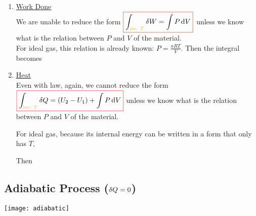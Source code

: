 \documentclass[class=article, crop=false, 12pt]{standalone}
\begin{document}
\begin{enumerate}
    \item \ul{Work Done}\\
    We are unable to reduce the form $\cbox[red]{\displaystyle \int_\yellow{\text{iso. }T}\var{W} = \int P\dd{V}}$ 
    unless we know what is the relation between $P$ and $V$ of the material.\\

    For ideal gas, this relation is already known: $\displaystyle P = \frac{nRT}{V}$.
    Then the integral becomes

    \item \ul{Heat}\\
    Even with  law, again, we cannot reduce the form $\cbox[red]{\displaystyle \int_\yellow{\text{iso. }T}\var{Q} = (U_2 - U_1) + \int P\dd{V}}$
    unless we know what is the relation between $P$ and $V$ of the material.

    For ideal gas, because its internal energy can be written in a form that only has $T$,

    Then 

\end{enumerate}

\subsection{Adiabatic Process ($\var{Q}=0$)}

\begin{center}
    \begin{minipage}{0.3\linewidth}
        \centering
        \texttt{[image: adiabatic]}
    \end{minipage}
    \begin{minipage}{0.4\linewidth}
        \centering
    \end{minipage}
\end{center}
\end{document}
